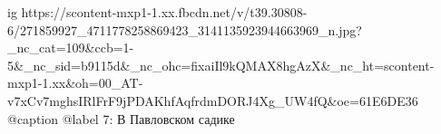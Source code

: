  
 
 
 
 

\ifcmt
  ig https://scontent-mxp1-1.xx.fbcdn.net/v/t39.30808-6/271859927_4711778258869423_3141135923944663969_n.jpg?_nc_cat=109&ccb=1-5&_nc_sid=b9115d&_nc_ohc=fixaiIl9kQMAX8hgAzX&_nc_ht=scontent-mxp1-1.xx&oh=00_AT-v7xCv7mghsIRlFrF9jPDAKhfAqfrdmDORJ4Xg_UW4fQ&oe=61E6DE36
  @caption @label 7: В Павловском садике
\fi

